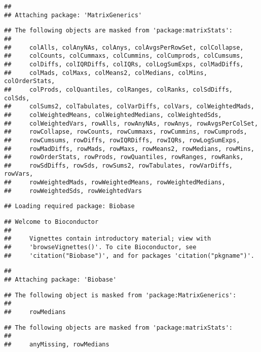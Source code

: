 \documentclass[
]{article}
\begin{document}
\begin{verbatim}
## 
## Attaching package: 'MatrixGenerics'
\end{verbatim}

\begin{verbatim}
## The following objects are masked from 'package:matrixStats':
## 
##     colAlls, colAnyNAs, colAnys, colAvgsPerRowSet, colCollapse,
##     colCounts, colCummaxs, colCummins, colCumprods, colCumsums,
##     colDiffs, colIQRDiffs, colIQRs, colLogSumExps, colMadDiffs,
##     colMads, colMaxs, colMeans2, colMedians, colMins, colOrderStats,
##     colProds, colQuantiles, colRanges, colRanks, colSdDiffs, colSds,
##     colSums2, colTabulates, colVarDiffs, colVars, colWeightedMads,
##     colWeightedMeans, colWeightedMedians, colWeightedSds,
##     colWeightedVars, rowAlls, rowAnyNAs, rowAnys, rowAvgsPerColSet,
##     rowCollapse, rowCounts, rowCummaxs, rowCummins, rowCumprods,
##     rowCumsums, rowDiffs, rowIQRDiffs, rowIQRs, rowLogSumExps,
##     rowMadDiffs, rowMads, rowMaxs, rowMeans2, rowMedians, rowMins,
##     rowOrderStats, rowProds, rowQuantiles, rowRanges, rowRanks,
##     rowSdDiffs, rowSds, rowSums2, rowTabulates, rowVarDiffs, rowVars,
##     rowWeightedMads, rowWeightedMeans, rowWeightedMedians,
##     rowWeightedSds, rowWeightedVars
\end{verbatim}

\begin{verbatim}
## Loading required package: Biobase
\end{verbatim}

\begin{verbatim}
## Welcome to Bioconductor
## 
##     Vignettes contain introductory material; view with
##     'browseVignettes()'. To cite Bioconductor, see
##     'citation("Biobase")', and for packages 'citation("pkgname")'.
\end{verbatim}

\begin{verbatim}
## 
## Attaching package: 'Biobase'
\end{verbatim}

\begin{verbatim}
## The following object is masked from 'package:MatrixGenerics':
## 
##     rowMedians
\end{verbatim}

\begin{verbatim}
## The following objects are masked from 'package:matrixStats':
## 
##     anyMissing, rowMedians
\end{verbatim}
\end{document}
